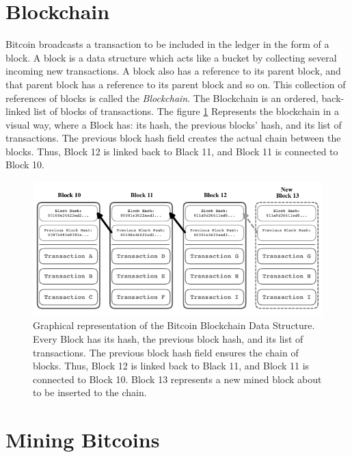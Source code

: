 \documentclass[../../thesis.tex]{subfiles}
\begin{document}
\section{Blockchain}
\label{sec:blockchain}

Bitcoin broadcasts a transaction to be included in the ledger in the form of a block. A block is a data structure which acts like a bucket by collecting several incoming new transactions. A block also has a reference to its parent block, and that parent block has a reference to its parent block and so on. This collection of references of blocks is called the \textit{Blockchain}. The Blockchain is an ordered, back-linked list of blocks of transactions. The figure \ref{fig:blockchain} Represents the blockchain in a visual way, where a Block has: its hash, the previous blocks' hash, and its list of transactions. The previous block hash field creates the actual chain between the blocks. Thus, Block 12 is linked back to Black 11, and Block 11 is connected to Block 10. 

\begin{figure}[H]
\centering
\includegraphics[width=\textwidth]{content/bitcoin/img/blockchain}
\caption{Graphical representation of the Bitcoin Blockchain Data Structure. Every Block has its hash, the previous block hash, and its list of transactions. The previous block hash field ensures the chain of blocks. Thus, Block 12 is linked back to Black 11, and Block 11 is connected to Block 10. Block 13 represents a new mined block about to be inserted to the chain. }
\label{fig:blockchain}
\end{figure}

\section{Mining Bitcoins}
\label{sec:bitcoin_mining}
\end{document}
